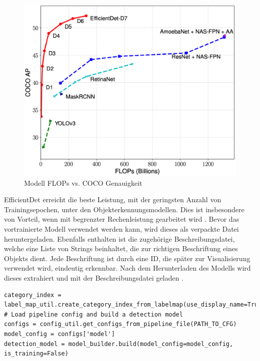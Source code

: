\begin{figure}[htb]
	\centering
	\includegraphics[width=\textwidth]{images/efficientdet}
	\caption[Modell FLOPs vs COCO Genauigkeit]{Modell \acp{FLOP} vs. \ac{COCO} Genauigkeit \cite{tan2020efficientdet}}
\end{figure}

EfficientDet erreicht die beste Leistung, mit der geringsten Anzahl von Trainingsepochen, unter den Objekterkennungsmodellen. Dies ist insbesondere von Vorteil, wenn mit begrenzter Rechenleistung gearbeitet wird \cite{solawetz}. Bevor das vortrainierte Modell verwendet werden kann, wird dieses als verpackte Datei heruntergeladen. Ebenfalls enthalten ist die zugehörige Beschreibungsdatei, welche eine Liste von Strings beinhaltet, die zur richtigen Beschriftung eines Objekts dient. Jede Beschriftung ist durch eine ID, die später zur Visualisierung verwendet wird, eindeutig erkennbar. Nach dem Herunterladen des Modells wird dieses extrahiert und mit der Beschreibungsdatei geladen \cite{obd_api}.
\vspace*{5mm}
\begin{lstlisting}[caption={Laden der Beschreibungsdatei mit anschließendem Erzeugen des Modells}, label={lst:loading}]
category_index = label_map_util.create_category_index_from_labelmap(use_display_name=True)
# Load pipeline config and build a detection model
configs = config_util.get_configs_from_pipeline_file(PATH_TO_CFG)
model_config = configs['model']
detection_model = model_builder.build(model_config=model_config, is_training=False)
\end{lstlisting}

